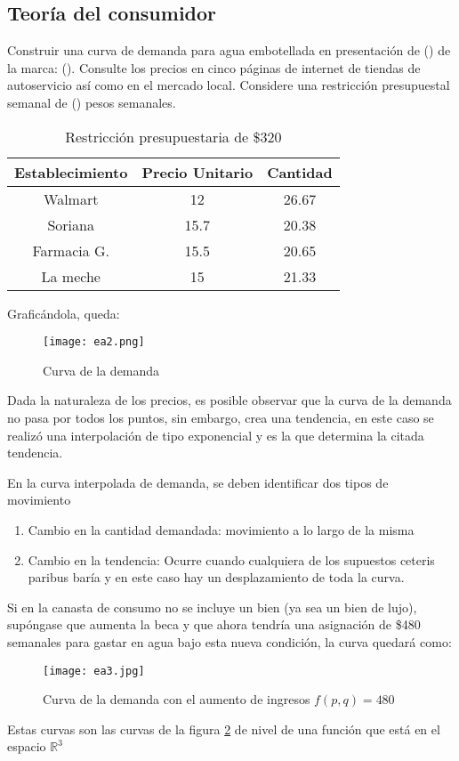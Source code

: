 \subsection{Teoría del consumidor}
\begin{example}
\label{exae1}
    Construir una curva de demanda para agua embotellada en presentación de () de la marca: (). Consulte los precios en cinco páginas de internet de tiendas de autoservicio así como en el mercado local. Considere una restricción presupuestal semanal de () pesos semanales.
    \begin{table}[h!]
        \centering
        \begin{tabular}{@{}ccc@{}}
        \toprule
        Establecimiento & Precio Unitario & Cantidad \\ \midrule
        Walmart         & 12              & 26.67    \\
        Soriana         & 15.7            & 20.38    \\
        Farmacia G.    & 15.5            & 20.65    \\
        La meche           & 15              & 21.33    \\ \bottomrule
        \end{tabular}
        \caption{Restricción presupuestaria de \$320}
        \label{tabe5}
    \end{table}
    Graficándola, queda:
    \begin{figure}[h!]
    \centering
      \texttt{[image: ea2.png]}
      \caption{Curva de la demanda}
      \label{ea2}
    \end{figure}
\end{example}
Dada la naturaleza de los precios, es posible observar que la curva de la demanda no pasa por todos los puntos, sin embargo, crea una tendencia, en este caso se realizó una interpolación de tipo exponencial y es la que determina la citada tendencia.

En la curva interpolada de demanda, se deben identificar dos tipos de movimiento
\begin{enumerate}
    \item Cambio en la cantidad demandada: movimiento a lo largo de la misma
    \item Cambio en la tendencia: Ocurre cuando cualquiera de los supuestos ceteris paribus baría y en este caso hay un desplazamiento de toda la curva.
\end{enumerate}
Si en la canasta de consumo no se incluye un bien (ya sea un bien de lujo), supóngase que aumenta la beca y que ahora tendría una asignación de \$480 semanales para gastar en agua bajo esta nueva condición, la curva quedará como:
\begin{figure}[h!]
\centering
  \texttt{[image: ea3.jpg]}
  \caption{Curva de la demanda con el aumento de ingresos $f(p,q)= 480$}
  \label{ea3}
\end{figure}
Estas curvas son las curvas de la figura \ref{ea3} de nivel de una función que está en el espacio $\mathbb{R}^3$

